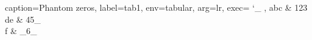 \documentclass[a4paper]{article}
\begin{document}
\begin{tableobject}{caption=Phantom zeros, label=tab1, env=tabular, arg=lr,
	exec=
		\catcode`_\active
		,
}
	\toprule
	abc & 123  \\
	de  & 45_  \\
	f   & _6_  \\
	\bottomrule
\end{tableobject}
\end{document}
